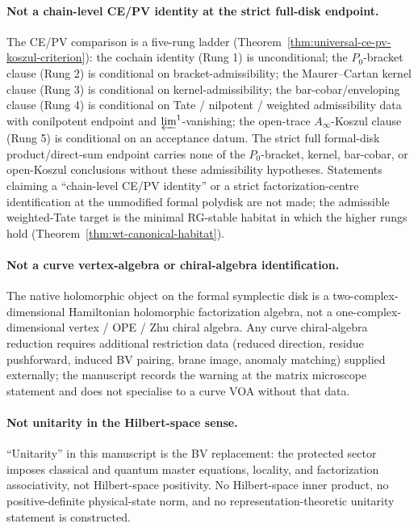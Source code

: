 \paragraph{Not a chain-level CE/PV identity at the strict full-disk endpoint.}
The CE/PV comparison is a five-rung ladder
(Theorem~\ref{thm:universal-ce-pv-koszul-criterion}): the cochain
identity (Rung 1) is unconditional; the \(P_0\)-bracket clause (Rung
2) is conditional on bracket-admissibility; the Maurer--Cartan kernel
clause (Rung 3) is conditional on kernel-admissibility; the
bar-cobar/enveloping clause (Rung 4) is conditional on Tate /
nilpotent / weighted admissibility data with conilpotent endpoint and
\(\varprojlim^1\)-vanishing; the open-trace \(A_\infty\)-Koszul clause
(Rung 5) is conditional on an acceptance datum.  The strict full
formal-disk product/direct-sum endpoint carries none of the
\(P_0\)-bracket, kernel, bar-cobar, or open-Koszul conclusions
without these admissibility hypotheses.  Statements claiming a
``chain-level CE/PV identity'' or a strict factorization-centre
identification at the unmodified formal polydisk are not made; the
admissible weighted-Tate target is the minimal RG-stable habitat in
which the higher rungs hold (Theorem~\ref{thm:wt-canonical-habitat}).

\paragraph{Not a curve vertex-algebra or chiral-algebra identification.}
The native holomorphic object on the formal symplectic disk is a
two-complex-dimensional Hamiltonian holomorphic factorization algebra,
not a one-complex-dimensional vertex / OPE / Zhu chiral algebra.  Any
curve chiral-algebra reduction requires additional restriction data
(reduced direction, residue pushforward, induced BV pairing,
brane image, anomaly matching) supplied externally; the manuscript
records the warning at the matrix microscope statement and does not
specialise to a curve VOA without that data.

\paragraph{Not unitarity in the Hilbert-space sense.}  ``Unitarity'' in
this manuscript is the BV replacement: the protected sector imposes
classical and quantum master equations, locality, and factorization
associativity, not Hilbert-space positivity.  No Hilbert-space inner
product, no positive-definite physical-state norm, and no
representation-theoretic unitarity statement is constructed.

